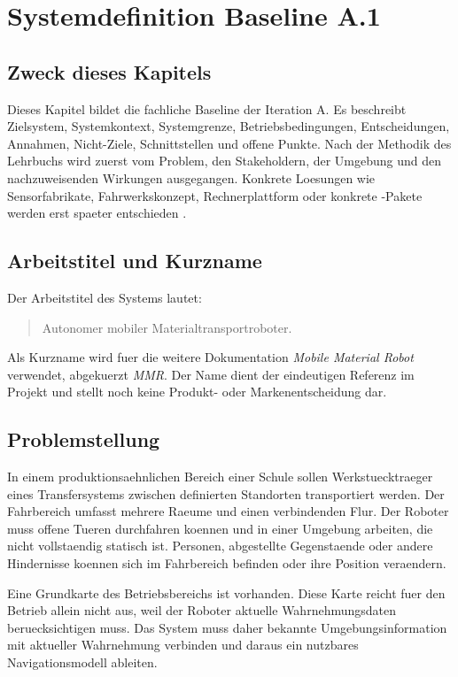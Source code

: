 \chapter{Systemdefinition Baseline A.1}
\label{chap:systemdefinition}

\section{Zweck dieses Kapitels}

Dieses Kapitel bildet die fachliche Baseline der Iteration A. Es beschreibt Zielsystem, Systemkontext, Systemgrenze, Betriebsbedingungen, Entscheidungen, Annahmen, Nicht-Ziele, Schnittstellen und offene Punkte. Nach der Methodik des Lehrbuchs wird zuerst vom Problem, den Stakeholdern, der Umgebung und den nachzuweisenden Wirkungen ausgegangen. Konkrete Loesungen wie Sensorfabrikate, Fahrwerkskonzept, Rechnerplattform oder konkrete \ros-Pakete werden erst spaeter entschieden \cite[Kap.~1--2]{becker2026sysml}.

\section{Arbeitstitel und Kurzname}

Der Arbeitstitel des Systems lautet:
\begin{quote}
Autonomer mobiler Materialtransportroboter.
\end{quote}

Als Kurzname wird fuer die weitere Dokumentation \emph{Mobile Material Robot} verwendet, abgekuerzt \emph{MMR}. Der Name dient der eindeutigen Referenz im Projekt und stellt noch keine Produkt- oder Markenentscheidung dar.

\section{Problemstellung}

In einem produktionsaehnlichen Bereich einer Schule sollen Werkstuecktraeger eines Transfersystems zwischen definierten Standorten transportiert werden. Der Fahrbereich umfasst mehrere Raeume und einen verbindenden Flur. Der Roboter muss offene Tueren durchfahren koennen und in einer Umgebung arbeiten, die nicht vollstaendig statisch ist. Personen, abgestellte Gegenstaende oder andere Hindernisse koennen sich im Fahrbereich befinden oder ihre Position veraendern.

Eine Grundkarte des Betriebsbereichs ist vorhanden. Diese Karte reicht fuer den Betrieb allein nicht aus, weil der Roboter aktuelle Wahrnehmungsdaten beruecksichtigen muss. Das System muss daher bekannte Umgebungsinformation mit aktueller Wahrnehmung verbinden und daraus ein nutzbares Navigationsmodell ableiten.

